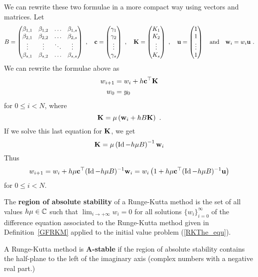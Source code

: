 We can rewrite these two formulae in a more compact way using vectors and
matrices.  Let
\[
B = \begin{pmatrix} \beta_{1,1} & \beta_{1,2} & \ldots & \beta_{1,s} \\
\beta_{2,1} & \beta_{2,2} & \ldots & \beta_{2,s} \\
\vdots & \vdots & \ddots & \vdots \\
\beta_{s,1} & \beta_{s,2} & \ldots & \beta_{s,s}
\end{pmatrix}
\ , \quad
\mathbf{c} = \begin{pmatrix} \gamma_1 \\ \gamma_2 \\ \vdots \\ \gamma_s
\end{pmatrix}
\ , \quad
\mathbf{K} = \begin{pmatrix} K_1 \\ K_2 \\ \vdots \\ K_s \end{pmatrix}
\ , \quad
\mathbf{u} = \begin{pmatrix} 1 \\ 1 \\ \vdots \\ 1 \end{pmatrix}
\quad \text{and} \quad
\mathbf{w}_i = w_i \mathbf{u} \ .
\]
We can rewrite the formulae above as
\begin{align*}
w_{i+1} &= w_i + h \mathbf{c}^{\top} \mathbf{K} \\
w_0 &= y_0
\end{align*}
for $0\leq i < N$, where
\[
\mathbf{K} = \mu \left( \mathbf{w}_i + h B \mathbf{K}\right) \ .
\]
If we solve this last equation for $\mathbf{K}$, we get
\[
  \mathbf{K} = \mu\left( \operatorname{Id} - h\mu B\right)^{-1} \mathbf{w}_i
\]
Thus
\begin{equation}\label{RK_stabA1}
  w_{i+1} = w_i + h\mu \mathbf{c}^{\top}(\operatorname{Id}-h\mu B)^{-1} \mathbf{w}_i
= w_i\left(1 + h\mu \mathbf{c}^{\top}(\operatorname{Id}-h\mu B)^{-1}\mathbf{u} \right)
\end{equation}
for $0\leq i <N$.

\begin{defn}
The {\bfseries region of absolute stability} of a Runge-Kutta method 
is the set of all values $h\mu \in \mathbb{C}$ such that
$\displaystyle \lim_{i\rightarrow +\infty} w_i = 0$ for all solutions
$\{w_i\}_{i=0}^\infty$ of the difference equation associated to the
Runge-Kutta method given in Definition~\ref{GFRKM} applied to the initial
value problem (\ref{RKThe_equ}).  \label{DefnABSAS}

A Runge-Kutta method is
{\bfseries A-stable} if the region of absolute
stability contains the half-plane to the left of the imaginary axis
(complex numbers with a negative real part.)
\end{defn}

